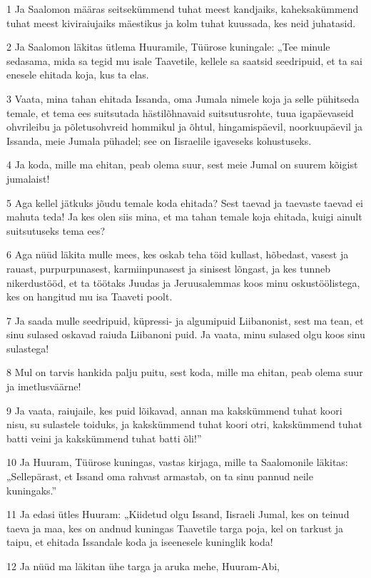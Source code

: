 \par 1 Ja Saalomon määras seitsekümmend tuhat meest kandjaiks, kaheksakümmend tuhat meest kiviraiujaiks mäestikus ja kolm tuhat kuussada, kes neid juhatasid.
\par 2 Ja Saalomon läkitas ütlema Huuramile, Tüürose kuningale: „Tee minule sedasama, mida sa tegid mu isale Taavetile, kellele sa saatsid seedripuid, et ta sai enesele ehitada koja, kus ta elas.
\par 3 Vaata, mina tahan ehitada Issanda, oma Jumala nimele koja ja selle pühitseda temale, et tema ees suitsutada hästilõhnavaid suitsutusrohte, tuua igapäevaseid ohvrileibu ja põletusohvreid hommikul ja õhtul, hingamispäevil, noorkuupäevil ja Issanda, meie Jumala pühadel; see on Iisraelile igaveseks kohustuseks.
\par 4 Ja koda, mille ma ehitan, peab olema suur, sest meie Jumal on suurem kõigist jumalaist!
\par 5 Aga kellel jätkuks jõudu temale koda ehitada? Sest taevad ja taevaste taevad ei mahuta teda! Ja kes olen siis mina, et ma tahan temale koja ehitada, kuigi ainult suitsutuseks tema ees?
\par 6 Aga nüüd läkita mulle mees, kes oskab teha töid kullast, hõbedast, vasest ja rauast, purpurpunasest, karmiinpunasest ja sinisest lõngast, ja kes tunneb nikerdustööd, et ta töötaks Juudas ja Jeruusalemmas koos minu oskustöölistega, kes on hangitud mu isa Taaveti poolt.
\par 7 Ja saada mulle seedripuid, küpressi- ja algumipuid Liibanonist, sest ma tean, et sinu sulased oskavad raiuda Liibanoni puid. Ja vaata, minu sulased olgu koos sinu sulastega!
\par 8 Mul on tarvis hankida palju puitu, sest koda, mille ma ehitan, peab olema suur ja imetlusväärne!
\par 9 Ja vaata, raiujaile, kes puid lõikavad, annan ma kakskümmend tuhat koori nisu, su sulastele toiduks, ja kakskümmend tuhat koori otri, kakskümmend tuhat batti veini ja kakskümmend tuhat batti õli!”
\par 10 Ja Huuram, Tüürose kuningas, vastas kirjaga, mille ta Saalomonile läkitas: „Sellepärast, et Issand oma rahvast armastab, on ta sinu pannud neile kuningaks.”
\par 11 Ja edasi ütles Huuram: „Kiidetud olgu Issand, Iisraeli Jumal, kes on teinud taeva ja maa, kes on andnud kuningas Taavetile targa poja, kel on tarkust ja taipu, et ehitada Issandale koda ja iseenesele kuninglik koda!
\par 12 Ja nüüd ma läkitan ühe targa ja aruka mehe, Huuram-Abi,
